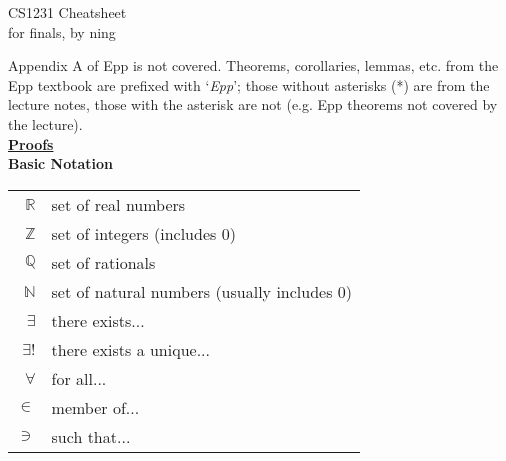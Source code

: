 \documentclass[a4paper]{article}
\newcommand{\heading}[1]{{\small\underline{\textbf{#1}}}}
\newcommand{\subheading}[1]{{\scriptsize\textbf{#1}}}
\begin{document}
\scriptsize                         %
\setlength\parindent{0pt}           %
\setlength{\abovedisplayskip}{3pt}  %
\setlength{\belowdisplayskip}{3pt}  %

\begin{center}
  {\large CS1231 Cheatsheet}\\{for finals, by ning}
\end{center}

\begin{multicols*}{4}

Appendix A of Epp is not covered. Theorems, corollaries, lemmas, etc. from the
Epp textbook are prefixed with `\textit{Epp}'; those without asterisks (*) are
from the lecture notes, those with the asterisk are not (e.g. Epp theorems not
covered by the lecture).\\

\heading{Proofs} \\

\subheading{Basic Notation}\\

\begin{tabularx}{\columnwidth}{rX}
  $\mathbb{R}$ & set of real numbers \\
  $\mathbb{Z}$ & set of integers (includes $0$) \\
  $\mathbb{Q}$ & set of rationals \\
  $\mathbb{N}$ & set of natural numbers (usually includes $0$) \\
  $\exists$    & there exists... \\
  $\exists!$   & there exists a unique... \\
  $\forall$    & for all... \\
  $\in$        & member of... \\
  $\ni$        & such that... \\
\end{tabularx}\\


\end{multicols*}
\end{document}
